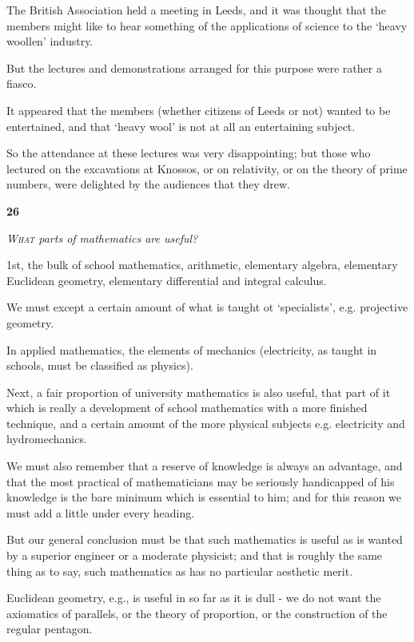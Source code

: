 \documentclass{article}
\numberwithin{equation}{section}
\begin{document}
The British Association held a meeting in Leeds, and it was thought that the members might like to hear something of the applications of science to the `heavy woollen' industry.

But the lectures and demonstrations arranged for this purpose were rather a fiasco.

It appeared that the members (whether citizens of Leeds or not) wanted to be entertained, and that `heavy wool' is not at all an entertaining subject.

So the attendance at these lectures was very disappointing; but those who lectured on the excavations at Knossos, or on relativity, or on the theory of prime numbers, were delighted by the audiences that they drew.

\begin{center}
    \large\textbf{26}
\end{center}
\textit{\textsc{What} parts of mathematics are useful?}

%
1st, the bulk of school mathematics, arithmetic, elementary algebra, elementary Euclidean geometry, elementary differential and integral calculus.

We must except a certain amount of what is taught ot `specialists', e.g. projective geometry.

In applied mathematics, the elements of mechanics (electricity, as taught in schools, must be classified as physics).

%
Next, a fair proportion of university mathematics is also useful, that part of it which is really a development of school mathematics with a more finished technique, and a certain amount of the more physical subjects e.g. electricity and hydromechanics.

We must also remember that a reserve of knowledge is always an advantage, and that the most practical of mathematicians may be seriously handicapped of his knowledge is the bare minimum which is essential to him; and for this reason we must add a little under every heading.

But our general conclusion must be that such mathematics is useful as is wanted by a superior engineer or a moderate physicist; and that is roughly the same thing as to say, such mathematics as has no particular aesthetic merit.

Euclidean geometry, e.g., is useful in so far as it is dull - we do not want the axiomatics of parallels, or the theory of proportion, or the construction of the regular pentagon.
\end{document}

